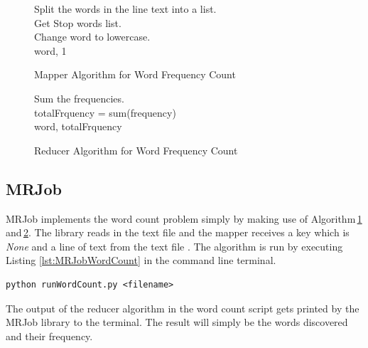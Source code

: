 \documentclass[10pt, twocolumn]{article}
\makeatletter
\newcommand{\removelatexerror}{\let\@latex@error\@gobble}
\makeatother
\begin{document}
\begin{figure}[H]
     \removelatexerror
    \begin{algorithm}[H]
       \label{Alg:MapperWordCount}
        \caption{Mapper Algorithm for Word Frequency Count}
        Split the words in the line text into a list. \\
        Get Stop words list.\\
        {   
            Change word to lowercase.\\
            {
                \Return word, 1
            }
        }
    \end{algorithm}
\end{figure}
\begin{figure}[H]
     \removelatexerror
    \begin{algorithm}[H]
       \label{Alg:ReducerWordCount}
        \caption{Reducer Algorithm for Word Frequency Count}
        Sum the frequencies.\\
        totalFrquency = sum(frequency)\\
        \Return word, totalFrquency
    \end{algorithm}
\end{figure}

\subsection{MRJob}
%
MRJob implements the word count problem simply by making use of Algorithm\,\ref*{Alg:MapperWordCount}\,and\,\ref*{Alg:ReducerWordCount}. The library reads in the text file and the mapper receives a key which is \emph{None} and a line of text from the text file \cite{ELEN4020A_REF:MRJob067}. The algorithm is run by executing Listing \ref*{lst:MRJobWordCount} in the command line terminal.
%
\begin{center}
\begin{minipage}{0.95\columnwidth}
\begin{lstlisting}[style=bashStyle, label=lst:MRJobWordCount, caption = Command to execute Word Count using MRJob]
python runWordCount.py <filename>
\end{lstlisting}
\end{minipage}
\end{center}
%
The output of the reducer algorithm in the word count script gets printed by the MRJob library to the terminal. The result will simply be the words discovered and their frequency.
%
\end{document}
